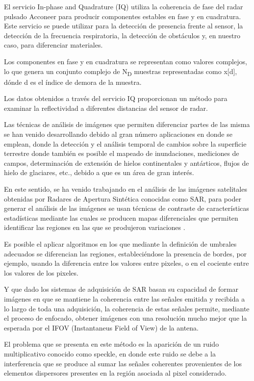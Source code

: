 El servicio In-phase and Quadrature (IQ) utiliza la coherencia de fase del radar pulsado Acconeer para producir componentes estables en fase y en cuadratura. Este servicio se puede utilizar para la detección de presencia frente al sensor, la detección de la frecuencia respiratoria, la detección de obstáculos y, en nuestro caso, para diferenciar materiales.

Los componentes en fase y en cuadratura se representan como valores complejos, lo que genera un conjunto complejo de N\textsubscript{D} muestras representadas como x[d], dónde d es el índice de demora de la muestra.

Los datos obtenidos a través del servicio IQ proporcionan un método para examinar la reflectividad a diferentes distancias del sensor de radar.

Las técnicas de análisis de imágenes que permiten diferenciar partes de las misma se han venido desarrollando debido al gran número aplicaciones en donde se emplean, donde la detección y el análisis temporal de cambios sobre la superficie terrestre donde también es posible el mapeado de inundaciones, mediciones de campos, determinación de extensión de hielos continentales y antárticos, flujos de hielo de glaciares, etc., debido a que es un área de gran interés.

En este sentido, se ha venido trabajando en el análisis de las imágenes satelitales obtenidas por Radares de Apertura Sintética conocidas como SAR, para poder generar el análisis de las imágenes se usan técnicas de contraste de características estadísticas mediante las cuales se producen mapas diferenciales que permiten identificar las regiones en las que se produjeron variaciones \cite{Varela2019}.

Es posible el aplicar algoritmos en los que mediante la definición de umbrales adecuados se diferencian las regiones, estableciéndose la presencia de bordes, por ejemplo, usando la diferencia entre los valores entre pixeles, o en el cociente entre los valores de los pixeles.

Y que dado los sistemas de adquisición de SAR basan su capacidad de formar imágenes en que se mantiene la coherencia entre las señales emitida y recibida a lo largo de toda una adquisición, la coherencia de estas señales permite, mediante el proceso de enfocado, obtener imágenes con una resolución mucho mejor que la esperada por el IFOV (Instantaneus Field of View) de la antena. 

El problema que se presenta en este método es la aparición de un ruido multiplicativo conocido como speckle, en donde este ruido se debe a la interferencia que se produce al sumar las señales coherentes provenientes de los elementos dispersores presentes en la región asociada al pixel considerado.

